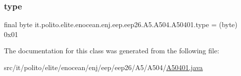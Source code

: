\subsubsection{\texorpdfstring{type}{type}}
{\footnotesize\ttfamily final byte it.\+polito.\+elite.\+enocean.\+enj.\+eep.\+eep26.\+A5.\+A504.\+A50401.\+type = (byte) 0x01\hspace{0.3cm}{\ttfamily [static]}}



The documentation for this class was generated from the following file\+:\begin{DoxyCompactItemize}
\item 
src/it/polito/elite/enocean/enj/eep/eep26/\+A5/\+A504/\hyperlink{_a50401_8java}{A50401.\+java}\end{DoxyCompactItemize}
